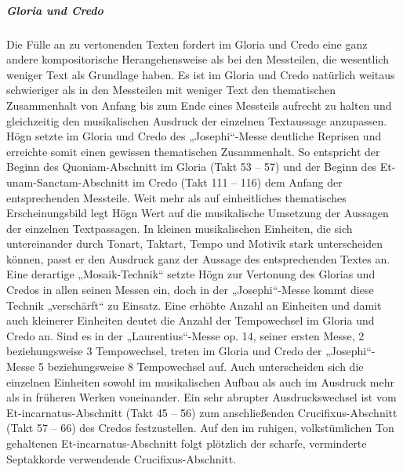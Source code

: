 \subparagraph{Gloria und Credo}
Die Fülle an zu vertonenden Texten fordert im Gloria und Credo eine ganz
andere kompositorische Herangehensweise als bei den Messteilen, die
wesentlich weniger Text als Grundlage haben. Es ist im Gloria und Credo
natürlich weitaus schwieriger als in den Messteilen mit weniger Text
den thematischen Zusammenhalt von Anfang bis zum Ende eines Messteils
aufrecht zu halten und gleichzeitig den musikalischen Ausdruck der
einzelnen Textaussage anzupassen. Högn setzte im Gloria und Credo des
„Josephi“-Messe deutliche Reprisen und erreichte somit einen gewissen
thematischen Zusammenhalt. So entspricht der Beginn des
Quoniam-Abschnitt im Gloria (Takt 53 – 57) und der Beginn des
Et-unam-Sanctam-Abschnitt im Credo (Takt 111 – 116) dem Anfang der
entsprechenden Messteile. Weit mehr als auf einheitliches thematisches
Erscheinungsbild legt Högn Wert auf die musikalische Umsetzung der
Aussagen der einzelnen Textpassagen. In kleinen musikalischen
Einheiten, die sich untereinander durch Tonart, Taktart, Tempo und
Motivik stark unterscheiden können, passt er den Ausdruck ganz der
Aussage des entsprechenden Textes an. Eine derartige „Mosaik-Technik“
setzte Högn zur Vertonung des Glorias und Credos in allen seinen Messen
ein, doch in der „Josephi“-Messe kommt diese Technik „verschärft“ zu
Einsatz. Eine erhöhte Anzahl an Einheiten und damit auch kleinerer
Einheiten deutet die Anzahl der Tempowechsel im Gloria und Credo an.
Sind es in der „Laurentius“-Messe op. 14, seiner ersten Messe, 2
beziehungsweise 3 Tempowechsel, treten im Gloria und Credo der
„Josephi“-Messe 5 beziehungsweise 8 Tempowechsel auf. Auch
unterscheiden sich die einzelnen Einheiten sowohl im musikalischen
Aufbau als auch im Ausdruck mehr als in früheren Werken voneinander.
Ein sehr abrupter Ausdruckswechsel ist vom Et-incarnatus-Abschnitt
(Takt 45 – 56) zum anschließenden Crucifixus-Abschnitt (Takt 57 – 66)
des Credos festzustellen. Auf den im ruhigen, volkstümlichen Ton
gehaltenen Et-incarnatus-Abschnitt folgt plötzlich der scharfe,
verminderte Septakkorde verwendende Crucifixus-Abschnitt.

